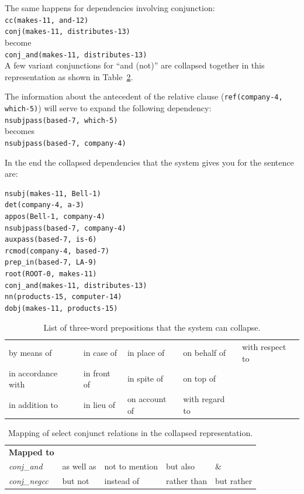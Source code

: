 \documentclass[11pt,letterpaper]{article}
\begin{document}
\noindent The same happens for dependencies involving conjunction:\\
\indent \texttt{cc(makes-11, and-12)}\\
\indent \texttt{conj(makes-11, distributes-13)}\\
become\\
\indent \texttt{conj\_and(makes-11, distributes-13)}\\
A few variant conjunctions for ``and (not)'' are collapsed together in this representation as shown in Table~\ref{conjand}.

\bigskip

\noindent The information about the antecedent of the relative clause (\texttt{ref(company-4, which-5)}) will serve to expand the following dependency:\\
\indent \texttt{nsubjpass(based-7, which-5)}\\
becomes\\
\indent \texttt{nsubjpass(based-7, company-4)}

\bigskip

\noindent In the end the collapsed dependencies that the system gives you for the sentence are:
\begin{verbatim}
nsubj(makes-11, Bell-1)
det(company-4, a-3)
appos(Bell-1, company-4)
nsubjpass(based-7, company-4)
auxpass(based-7, is-6)
rcmod(company-4, based-7)
prep_in(based-7, LA-9)
root(ROOT-0, makes-11)
conj_and(makes-11, distributes-13)
nn(products-15, computer-14)
dobj(makes-11, products-15)
\end{verbatim}

\begin{table}
\begin{center}
\begin{tabular}{lllll}\hline
by means of & in case of & in place of & on behalf of & with respect to\\
in accordance with & in front of & in spite of & on top of & \\
in addition to & in lieu of & on account of & with regard to &\\
 \hline
\end{tabular}
\caption{List of three-word prepositions that the system can collapse.}\label{3wp}
\end{center}
\end{table}

\begin{table}
\begin{center}
\begin{tabular}{lllll}\hline
\textbf{Mapped to} & \\
\emph{conj\_and} & as well as & not to mention & but also & \& \\
\emph{conj\_negcc} & but not & instead of & rather than & but rather \\
\hline
\end{tabular}
\caption{Mapping of select conjunct relations in the collapsed representation.}\label{conjand}
\end{center}
\end{table}
\end{document}
